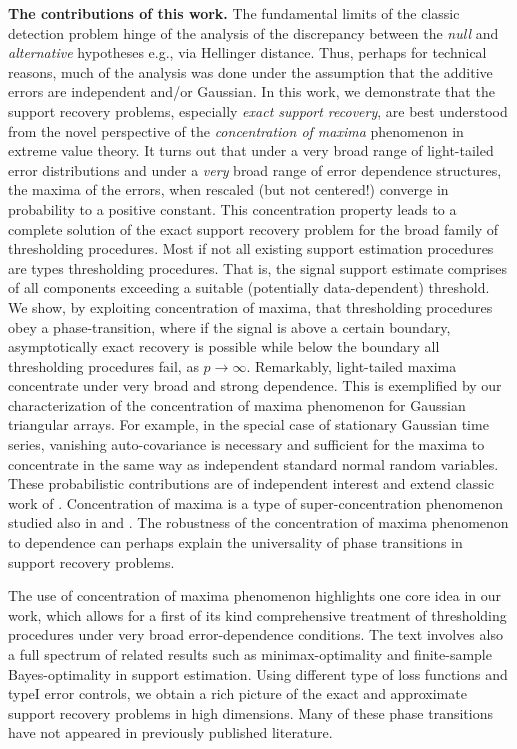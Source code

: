      
{\bf The contributions of this work.} The fundamental limits of the classic detection problem hinge 
of the analysis of the discrepancy between the {\em null} and {\em alternative} hypotheses e.g., via Hellinger distance.  Thus, perhaps 
for  technical reasons, much of the analysis was done under the assumption that the additive errors are independent and/or Gaussian.  
In this work, we demonstrate that the support recovery problems, especially {\em exact support recovery}, are best understood from 
the novel perspective of the {\em concentration of maxima} phenomenon in extreme value theory.  It turns out that under a very broad 
range of light-tailed error distributions and under a {\em very} broad range of error dependence structures, the maxima of the errors, 
when rescaled (but not centered!) converge in probability to a positive constant. This concentration property leads to a complete solution 
of the exact  support recovery problem for the broad family of thresholding procedures.  Most if not all existing support estimation procedures 
are types thresholding procedures.   That is, the signal support estimate comprises of all components exceeding a suitable (potentially 
data-dependent)  threshold.  We show, by exploiting concentration of maxima, that thresholding procedures obey a phase-transition, where if the signal is above a 
certain boundary, asymptotically exact recovery is possible while below the boundary all thresholding procedures fail, as $p\to\infty$.  
Remarkably, light-tailed maxima concentrate under very broad and strong dependence.  This is exemplified by our characterization of
the concentration of maxima phenomenon for Gaussian triangular arrays.  For example, in the special case of stationary Gaussian time
series, vanishing auto-covariance is necessary and sufficient for the maxima to concentrate in the same way as independent standard 
normal random variables.   These probabilistic contributions are of independent interest and extend classic work of \cite{berman1964limit}. 
Concentration of maxima is a type of super-concentration phenomenon studied also in \cite{chatterjee2014superconcentration} 
and \cite{tanguy:2015}.
The robustness of the concentration of maxima phenomenon to dependence can perhaps explain the universality 
of phase transitions in support recovery problems.

The use of concentration of maxima phenomenon highlights one core idea in our work, which allows for a first of its kind comprehensive 
treatment of thresholding procedures under very broad error-dependence conditions.  The text involves also a full spectrum of related results 
such as minimax-optimality and finite-sample Bayes-optimality in support estimation.  Using different type of loss functions and typeI error 
controls, we obtain a rich picture of the exact and approximate support recovery problems in high dimensions.  
Many of these phase transitions have not appeared in previously published literature.  

